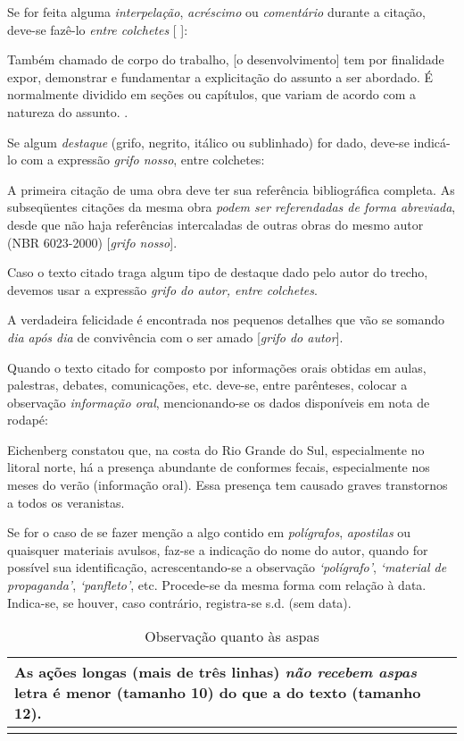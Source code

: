 Se for feita alguma \emph{interpelação}, \emph{acréscimo} ou \emph{comentário} durante a citação, deve-se fazê-lo \emph{entre colchetes} [ ]:

Também chamado de corpo do trabalho, [o desenvolvimento] tem por finalidade expor, demonstrar e fundamentar a explicitação do assunto a ser abordado. É normalmente dividido em seções ou capítulos, que variam de acordo com a natureza do assunto. \cite[p. 17]{garcia2000}.

Se algum \emph{destaque} (grifo, negrito, itálico ou sublinhado) for dado, deve-se indicá-lo com a expressão \emph{grifo nosso}, entre colchetes:

A primeira citação de uma obra deve ter sua referência bibliográfica completa. As subseqüentes citações da mesma obra \emph{podem ser referendadas de forma abreviada}, desde que não haja referências intercaladas de outras obras do mesmo autor (NBR 6023-2000) [\emph{grifo nosso}].

Caso o texto citado traga algum tipo de destaque dado pelo autor do trecho, devemos usar a expressão \emph{grifo do autor, entre colchetes}.

A verdadeira felicidade é encontrada nos pequenos detalhes que vão se somando \emph{dia após dia} de convivência com o ser amado \cite[p. 12]{guerrero2000} [\emph{grifo do autor}].

Quando o texto citado for composto por informações orais obtidas em aulas, palestras, debates, comunicações, etc. deve-se, entre parênteses, colocar a observação \emph{informação oral}, mencionando-se os dados disponíveis em nota de rodapé:

Eichenberg constatou que, na costa do Rio Grande do Sul, especialmente no litoral norte, há a presença abundante de conformes fecais, especialmente nos meses do verão (informação oral). Essa presença tem causado graves transtornos a todos os veranistas.

Se for o caso de se fazer menção a algo contido em \emph{polígrafos}, \emph{apostilas} ou quaisquer materiais avulsos, faz-se a indicação do nome do autor, quando for possível sua identificação, acrescentando-se a observação \emph{`polígrafo'}, \emph{`material de propaganda'}, \emph{`panfleto'}, etc. Procede-se da mesma forma com relação à data. Indica-se, se houver, caso contrário, registra-se s.d. (sem data).

\begin{table}[h]
    \caption{Observação quanto às aspas}
    \begin{center}
        \begin{tabular}{ p{\textwidth} }
            \hline
            As ações longas (mais de três linhas) \emph{não recebem aspas} letra é menor (tamanho 10) do que a do texto (tamanho 12). \\
            \hline
             \\
            \hline
        \end{tabular}
    \end{center}
    \label{tab:tipos-citacao-longa}
\end{table}

